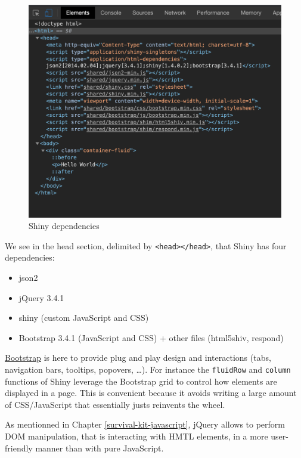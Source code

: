 \documentclass[]{book}
\providecommand{\tightlist}{%
  \setlength{\itemsep}{0pt}\setlength{\parskip}{0pt}}
\begin{document}
\begin{figure}
\includegraphics[width=14.92in]{images/survival-kit/shiny-deps} \caption{Shiny dependencies}\label{fig:shiny-deps}
\end{figure}

We see in the head section, delimited by \texttt{\textless{}head\textgreater{}\textless{}/head\textgreater{}}, that Shiny has four dependencies:

\begin{itemize}
\tightlist
\item
  json2
\item
  jQuery 3.4.1
\item
  shiny (custom JavaScript and CSS)
\item
  Bootstrap 3.4.1 (JavaScript and CSS) + other files (html5shiv, respond)
\end{itemize}

\href{https://getbootstrap.com}{Bootstrap} is here to provide plug and play design and interactions (tabs, navigation bars, tooltips, popovers, \ldots{}). For instance the \texttt{fluidRow} and \texttt{column} functions of Shiny leverage the Bootstrap grid to control how elements are displayed in a page. This is convenient because it avoids writing a large amount of CSS/JavaScript that essentially justs reinvents the wheel.

As mentionned in Chapter \ref{survival-kit-javascript}, jQuery allows to perform DOM manipulation, that is interacting with HMTL elements, in a more user-friendly manner than with pure JavaScript.
\end{document}
